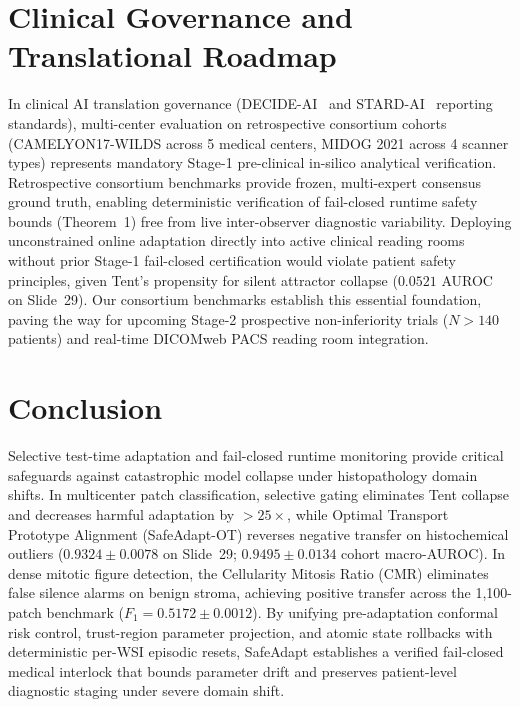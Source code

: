 \documentclass[journal]{IEEEtran}
\begin{document}
\section{Clinical Governance and Translational Roadmap}
In clinical AI translation governance (DECIDE-AI~\cite{decideai2022} and STARD-AI~\cite{stardai2020} reporting standards), multi-center evaluation on retrospective consortium cohorts (CAMELYON17-WILDS across 5 medical centers, MIDOG 2021 across 4 scanner types) represents mandatory Stage-1 pre-clinical in-silico analytical verification. Retrospective consortium benchmarks provide frozen, multi-expert consensus ground truth, enabling deterministic verification of fail-closed runtime safety bounds (Theorem~1) free from live inter-observer diagnostic variability. Deploying unconstrained online adaptation directly into active clinical reading rooms without prior Stage-1 fail-closed certification would violate patient safety principles, given Tent's propensity for silent attractor collapse ($0.0521$ AUROC on Slide~29). Our consortium benchmarks establish this essential foundation, paving the way for upcoming Stage-2 prospective non-inferiority trials ($N > 140$ patients) and real-time DICOMweb PACS reading room integration.

\section{Conclusion}
Selective test-time adaptation and fail-closed runtime monitoring provide critical safeguards against catastrophic model collapse under histopathology domain shifts. In multicenter patch classification, selective gating eliminates Tent collapse and decreases harmful adaptation by $>25\times$, while Optimal Transport Prototype Alignment (SafeAdapt-OT) reverses negative transfer on histochemical outliers ($0.9324 \pm 0.0078$ on Slide~29; $0.9495 \pm 0.0134$ cohort macro-AUROC). In dense mitotic figure detection, the Cellularity Mitosis Ratio (CMR) eliminates false silence alarms on benign stroma, achieving positive transfer across the 1,100-patch benchmark ($F_1 = 0.5172 \pm 0.0012$). By unifying pre-adaptation conformal risk control, trust-region parameter projection, and atomic state rollbacks with deterministic per-WSI episodic resets, SafeAdapt establishes a verified fail-closed medical interlock that bounds parameter drift and preserves patient-level diagnostic staging under severe domain shift.
\end{document}
